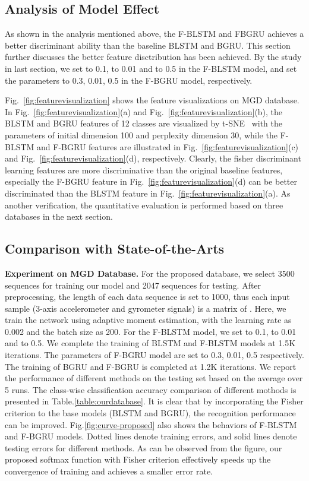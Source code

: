 \documentclass[review]{elsarticle}
\begin{document}
\subsection{Analysis of Model Effect}\label{sec:discussion}
As shown in the analysis mentioned above, the F-BLSTM and FBGRU achieves a better discriminant ability than the baseline BLSTM and BGRU. This section further discusses the better feature disctribution has been achieved. By the study in last section, we set  to 0.1,  to 0.01 and  to 0.5 in the F-BLSTM model, and set the parameters to 0.3, 0.01, 0.5 in the F-BGRU model, respectively.

Fig.~\ref{fig:featurevisualization} shows the feature visualizations on MGD database. In Fig.~\ref{fig:featurevisualization}(a) and Fig.~\ref{fig:featurevisualization}(b), the BLSTM and BGRU features of 12 classes are visualized by t-SNE~\cite{Maaten2009Science} with the parameters of initial dimension 100 and perplexity dimension 30, while the F-BLSTM and F-BGRU features are illustrated in Fig.~\ref{fig:featurevisualization}(c) and Fig.~\ref{fig:featurevisualization}(d), respectively. Clearly, the fisher discriminant learning features are more discriminative than the original baseline features, especially the F-BGRU feature in Fig.~\ref{fig:featurevisualization}(d) can be better discriminated than the BLSTM feature in Fig.~\ref{fig:featurevisualization}(a). As another verification, the quantitative evaluation is performed based on three databases in the next section.

\subsection{Comparison with State-of-the-Arts}\label{sec:comparison}
\textbf{Experiment on {MGD} Database.}
For the proposed database, we select 3500 sequences for training our model and 2047 sequences for testing. After preprocessing, the length of each data sequence is set to 1000, thus each input sample (3-axis accelerometer and gyrometer signals) is a matrix of {}. Here, we train the network using adaptive moment estimation, with the learning rate as 0.002 and the batch size as 200. For the F-BLSTM model, we set  to 0.1,  to 0.01 and  to 0.5. We complete the training of BLSTM and F-BLSTM models at 1.5K iterations. The parameters of F-BGRU model are set to 0.3, 0.01, 0.5 respectively. The training of BGRU and F-BGRU is completed at 1.2K iterations. We report the performance of different methods on the testing set based on the average over 5 runs. The class-wise classification accuracy comparison of different mothods is presented in Table.\;\ref{table:ourdatabase}. It is clear that by incorporating the Fisher criterion to the base models (BLSTM and BGRU), the recognition performance can be improved. Fig.\;\ref{fig:curve-proposed} also shows the behaviors of F-BLSTM and F-BGRU models. Dotted lines denote training errors, and solid lines denote testing errors for different methods. As can be observed from the figure, our proposed softmax function with Fisher criterion effectively speeds up the convergence of training and achieves a smaller error rate.
\end{document}
